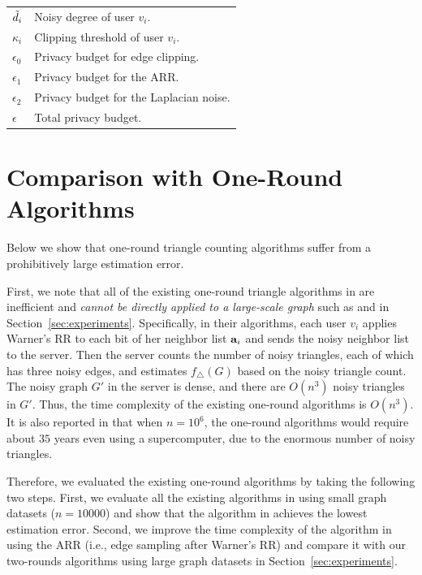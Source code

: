 \begin{table}[t]
{\begin{tabular}{l|l}
$\tilde{d}_i$     &   Noisy degree of user $v_i$.\\
$\kappa_i$ &   Clipping threshold of user $v_i$.\\
$\epsilon_0$     &       Privacy budget for edge clipping.\\
$\epsilon_1$     &       Privacy budget for the ARR.\\
$\epsilon_2$     &       Privacy budget for the Laplacian noise.\\
$\epsilon$     &       Total privacy budget.\\
\hline
\end{tabular}
\hfil}
\label{tab:notations}
\end{table}

\section{Comparison with One-Round Algorithms}
\label{sec:one-round}

Below we show that one-round triangle counting algorithms suffer from a prohibitively large estimation error.

First, we note that all of the existing one-round triangle algorithms in \cite{Imola_USENIX21,Ye_ICDE20,Ye_TKDE21} are inefficient and \textit{cannot be directly applied to a large-scale graph} such as \GPlus{} and \IMDB{} in Section~\ref{sec:experiments}.
Specifically, in their algorithms, each user $v_i$ applies Warner's RR to each bit of her neighbor list $\mathbf{a}_i$ and sends the noisy neighbor list to the server.
Then the server counts the number of noisy triangles, each of which has three noisy edges,
and estimates $f_\triangle(G)$ based on the noisy triangle count. 
The noisy graph $G'$ in the server is dense, and there are $O(n^3)$ noisy triangles in $G'$. 
Thus, the time complexity of the existing one-round algorithms \cite{Imola_USENIX21,Ye_ICDE20,Ye_TKDE21} is $O(n^3)$.
It is also reported in \cite{Imola_USENIX21} that when $n=10^6$, the one-round algorithms  would require about $35$ years even using a supercomputer, due to the enormous number of noisy triangles.

Therefore, we evaluated the existing one-round algorithms by taking the following two steps.
First, we evaluate all the existing algorithms in \cite{Imola_USENIX21,Ye_ICDE20,Ye_TKDE21} using small graph datasets ($n=10000$) and show that the algorithm in \cite{Imola_USENIX21} achieves the lowest estimation error.
Second, we improve the time complexity of the algorithm in \cite{Imola_USENIX21} using the ARR (i.e., edge sampling after Warner's RR) and compare it with our two-rounds algorithms using large graph datasets in Section~\ref{sec:experiments}.

